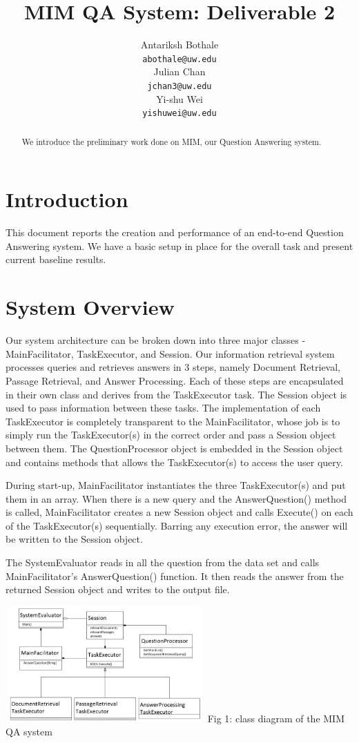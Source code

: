 \documentclass[11pt]{article}
\title{MIM QA System: Deliverable 2}
\author{Antariksh Bothale \\
  {\tt abothale@uw.edu} \\\And
  Julian Chan\\
  {\tt jchan3@uw.edu} \\\And
  Yi-shu Wei\\
  {\tt yishuwei@uw.edu}}
\date{}
\begin{document}
\maketitle
\begin{abstract}
We introduce the preliminary work done on MIM, our Question Answering system.
\end{abstract}

\section{Introduction}
This document reports the creation and performance of an end-to-end Question Answering system. We have a basic setup in place for the overall task and present current baseline results.  

\section{System Overview}

Our system architecture can be broken down into three major classes - MainFacilitator, TaskExecutor, and Session. Our information retrieval system processes queries and retrieves answers in 3 steps, namely Document Retrieval, Passage Retrieval, and Answer Processing. Each of these steps are encapsulated in their own class and derives from the TaskExecutor task.  The Session object is used to pass information between these tasks. The implementation of each TaskExecutor is completely transparent to the MainFacilitator, whose job is to simply run the TaskExecutor(s) in the correct order and pass a Session object between them. The QuestionProcessor object is embedded in the Session object and contains methods that allows the TaskExecutor(s) to access the user query.

During start-up, MainFacilitator instantiates the three TaskExecutor(s) and put them in an array. When there is a new query and the AnswerQuestion() method is called, MainFacilitator creates a new Session object and calls Execute() on each of the TaskExecutor(s) sequentially. Barring any execution error, the answer will be written to the Session object. 

The SystemEvaluator reads in all the question from the data set and calls MainFacilitator's AnswerQuestion() function. It then reads the answer from the returned Session object and 
writes to the output file.

\includegraphics[width=3in,height=1.75in]{MIM_class_diagram.png}
Fig 1: class diagram of the MIM QA system
\end{document}
